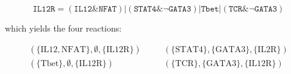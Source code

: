 \begin{footnotesize}
\[
 \mathtt{IL12R} = (\mathtt{IL12} \& \mathtt{NFAT}) | (\mathtt{STAT4} \& \neg \mathtt{GATA3}) | \mathtt{Tbet} | (\mathtt{TCR} \& \neg \mathtt{GATA3})
\]
\end{footnotesize}

\noindent
which yields the four reactions:

\begin{footnotesize}
\[
\begin{array}{ccc}
(\{\mathrm{IL12},\mathrm{NFAT}\},\emptyset,\{\mathrm{IL12R}\}) & \quad & (\{\mathrm{STAT4}\},\{\mathrm{GATA3}\},\{\mathrm{IL2R}\}) \\
(\{\mathrm{Tbet}\},\emptyset,\{\mathrm{IL12R}\}) &  \quad & (\{\mathrm{TCR}\},\{\mathrm{GATA3}\},\{\mathrm{IL12R}\}) \\ 
\end{array} 
\]
\end{footnotesize}

